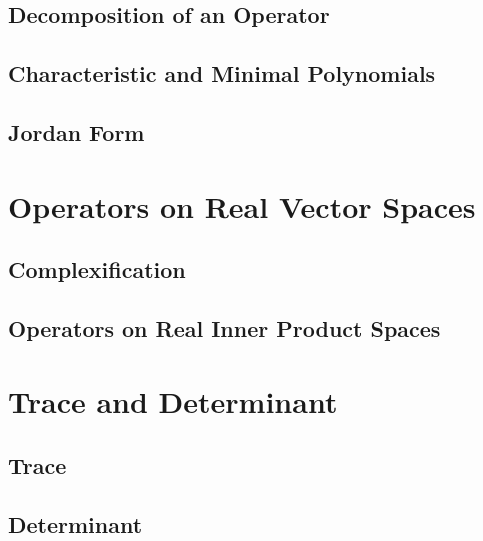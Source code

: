 \documentclass{article}
\begin{document}
\subsection{Decomposition of an Operator}

\subsection{Characteristic and Minimal Polynomials}

\subsection{Jordan Form}


\section{Operators on Real Vector Spaces}
\subsection{Complexification}

\subsection{Operators on Real Inner Product Spaces}


\section{Trace and Determinant}
\subsection{Trace}

\subsection{Determinant}
\end{document}
